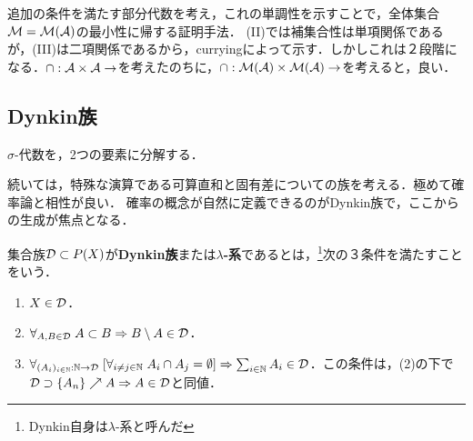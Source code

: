 \documentclass[uplatex, dvipdfmx]{jsreport}
\begin{document}
\begin{remarks}
    追加の条件を満たす部分代数を考え，これの単調性を示すことで，全体集合$\mathcal{M}=\mathcal{M}(\mathcal{A})$の最小性に帰する証明手法．
    (II)では補集合性は単項関係であるが，(III)は二項関係であるから，curryingによって示す．しかしこれは２段階になる．$\cap:\mathcal{A}\times\mathcal{A}\to$を考えたのちに，$\cap:\mathcal{M}(\mathcal{A})\times\mathcal{M}(\mathcal{A})\to$を考えると，良い．
\end{remarks}

\subsection{Dynkin族}

\begin{tcolorbox}[colframe=ForestGreen, colback=ForestGreen!10!white,breakable,colbacktitle=ForestGreen!40!white,coltitle=black,fonttitle=\bfseries\sffamily,
title=]
    $\sigma$-代数を，2つの要素に分解する．

    続いては，特殊な演算である可算直和と固有差についての族を考える．極めて確率論と相性が良い．
    確率の概念が自然に定義できるのがDynkin族で，ここからの生成が焦点となる．
\end{tcolorbox}

\begin{definition}
    集合族$\mathcal{D}\subset P(X)$が\textbf{Dynkin族}または\textbf{$\lambda$-系}であるとは，\footnote{Dynkin自身は$\lambda$-系と呼んだ}次の３条件を満たすことをいう．
    \begin{enumerate}
        \item $X\in\mathcal{D}$．
        \item $\forall_{A,B\in\mathcal{D}}\;A\subset B\Rightarrow B\setminus A\in\mathcal{D}$．
        \item $\forall_{(A_i)_{i\in\mathbb{N}}:\mathbb{N}\to\mathcal{D}}\;[\forall_{i\ne j\in\mathbb{N}}\;A_i\cap A_j=\emptyset]\Rightarrow \sum_{i\in\mathbb{N}}A_i\in\mathcal{D}$．この条件は，(2)の下で$\mathcal{D}\supset\{A_n\}\nearrow A\Rightarrow A\in\mathcal{D}$と同値．
    \end{enumerate}
\end{definition}
\end{document}
